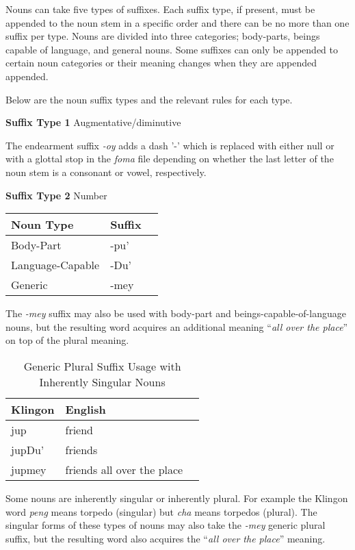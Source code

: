 \documentclass[11pt]{article}
\begin{document}
Nouns can take five types of suffixes. Each suffix type, if present, must be appended to the noun stem in a specific order and there can be no more than one suffix per type. Nouns are divided into three categories; body-parts, beings capable of language, and general nouns. Some suffixes can only be appended to certain noun categories or their meaning changes when they are appended appended.

Below are the noun suffix types and the relevant rules for each type.

\textbf{Suffix Type 1} Augmentative/diminutive

The endearment suffix \textit{-oy} adds a dash '-' which is replaced with either null or with a glottal stop in the \textit{foma} file depending on whether the last letter of the noun stem is a consonant or vowel, respectively.

\textbf{Suffix Type 2} Number

	\begin{center}
	\begin{tabular}{lll}
	\toprule
	\bf{Noun Type} & \bf{Suffix} \\
	\midrule
	Body-Part & -pu' \\
	Language-Capable & -Du' \\
	Generic & -mey \\
	\bottomrule
	\end{tabular}
	\end{center}

The \textit{-mey} suffix may also be used with body-part and beings-capable-of-language nouns, but the resulting word acquires an additional meaning ``\textit{all over the place}'' on top of the plural meaning.
	
	\begin{table}[h]
	\begin{center}
	\begin{tabular}{lll}
	\toprule
	\bf Klingon & \bf English \\
	\midrule
	jup & friend \\
	jupDu' & friends \\
	jupmey & friends all over the place \\
	\bottomrule
	\end{tabular}
	\end{center}
	\caption{Generic Plural Suffix Usage with Inherently Singular Nouns}
	\end{table}

Some nouns are inherently singular or inherently plural. For example the Klingon word \textit{peng} means torpedo (singular) but \textit{cha} means torpedos (plural). The singular forms of these types of nouns may also take the \textit{-mey} generic plural suffix, but the resulting word also acquires the ``\textit{all over the place}'' meaning.
	
\end{document}
